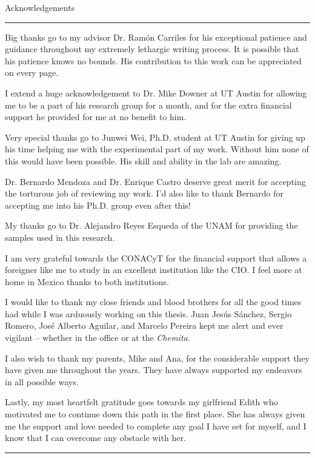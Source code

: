 \begin{vcenterpage}
{\LARGE{\sc Acknowledgements}}

\noindent\rule[2pt]{\textwidth}{0.5pt}

Big thanks go to my advisor Dr. Ram\'on Carriles for his exceptional patience and guidance throughout my extremely lethargic writing process. It is possible that his patience knows no bounds. His contribution to this work can be appreciated on every page.

I extend a huge acknowledgement to Dr. Mike Downer at UT Austin for allowing me to be a part of his research group for a month, and for the extra financial support he provided for me at no benefit to him. 

Very special thanks go to Junwei Wei, Ph.D. student at UT Austin for giving up his time helping me with the experimental part of my work. Without him none of this would have been possible. His skill and ability in the lab are amazing.

Dr. Bernardo Mendoza and Dr. Enrique Castro deserve great merit for accepting the torturous job of reviewing my work. I'd also like to thank Bernardo for accepting me into his Ph.D. group even after this!

My thanks go to Dr. Alejandro Reyes Esqueda of the UNAM for providing the samples used in this research.

I am very grateful towards the CONACyT for the financial support that allows a foreigner like me to study in an excellent institution like the CIO. I feel more at home in Mexico thanks to both institutions.

I would like to thank my close friends and blood brothers for all the good times had while I was arduously working on this thesis. Juan Jes\'us S\'anchez, Sergio Romero, Jos\'e Alberto Aguilar, and Marcelo Pereira kept me alert and ever vigilant -- whether in the office or at the \emph{Chemita}.

I also wish to thank my parents, Mike and Ana, for the considerable support they have given me throughout the years. They have always supported my endeavors in all possible ways.

Lastly, my most heartfelt gratitude goes towards my girlfriend Edith who motivated me to continue down this path in the first place. She has always given me the support and love needed to complete any goal I have set for myself, and I know that I can overcome any obstacle with her.

\noindent\rule[2pt]{\textwidth}{0.5pt}
\end{vcenterpage}
